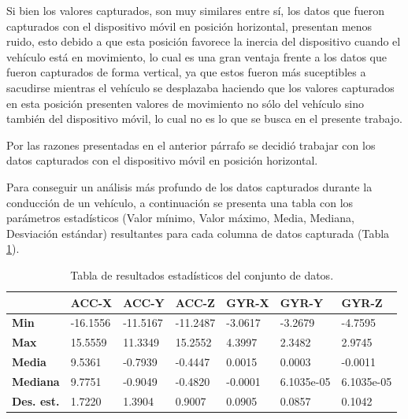 \vspace{5mm} %

Si bien los valores capturados, son muy similares entre s\'{i}, los datos que fueron capturados con el dispositivo m\'{o}vil en posici\'{o}n horizontal, presentan menos ruido, esto debido a que esta posici\'{o}n favorece la inercia del dispositivo cuando el veh\'{i}culo est\'{a} en movimiento, lo cual es una gran ventaja frente a los datos que fueron capturados de forma vertical, ya que estos fueron m\'{a}s suceptibles a sacudirse mientras el veh\'{i}culo se desplazaba haciendo que los valores capturados en esta posici\'{o}n presenten valores de movimiento no s\'{o}lo del veh\'{i}culo sino tambi\'{e}n del dispositivo m\'{o}vil, lo cual no es lo que se busca en el presente trabajo.

\vspace{5mm} %

Por las razones presentadas en el anterior p\'{a}rrafo se decidi\'{o} trabajar con los datos capturados con el dispositivo m\'{o}vil en posici\'{o}n horizontal.

\vspace{5mm} %

Para conseguir un an\'{a}lisis m\'{a}s profundo de los datos capturados durante la conducci\'{o}n de un veh\'{i}culo, a continuaci\'{o}n se presenta una tabla con los par\'{a}metros estad\'{i}sticos (Valor m\'{i}nimo, Valor m\'{a}ximo, Media, Mediana, Desviaci\'{o}n est\'{a}ndar) resultantes para cada columna de datos capturada (Tabla \ref{tab: est}).

\begin{center}
\begin{table}[]
\begin{center}
\begin{tabular}{|l|l|l|l|l|l|l|}
\hline
 & \textbf{ACC-X} & \textbf{ACC-Y} & \textbf{ACC-Z} &  \textbf{GYR-X} & \textbf{GYR-Y} & \textbf{GYR-Z} \\ \hline
\textbf{Min} & -16.1556 & -11.5167 & -11.2487 & -3.0617 & -3.2679 & -4.7595 \\ \hline
\textbf{Max} & 15.5559 & 11.3349 & 15.2552 & 4.3997 & 2.3482 & 2.9745 \\ \hline
\textbf{Media} & 9.5361 & -0.7939 & -0.4447 & 0.0015 & 0.0003 &-0.0011 \\ \hline
\textbf{Mediana} & 9.7751 & -0.9049 & -0.4820 & -0.0001 & 6.1035e-05 & 6.1035e-05 \\ \hline
\textbf{Des. est.} & 1.7220 & 1.3904 & 0.9007 & 0.0905 & 0.0857 & 0.1042 \\ \hline

\end{tabular}

\end{center}
\caption{Tabla de resultados estad\'{i}sticos del conjunto de datos.}
\label{tab: est}
\end{table}
\end{center}

